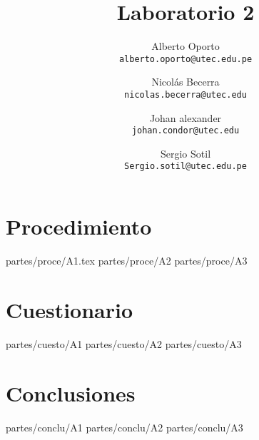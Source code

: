 \documentclass[12pt]{article}
\title{\textbf{Laboratorio 2}}
\author{
		Alberto Oporto\\
		\texttt{alberto.oporto@utec.edu.pe}\\
		\and Nicolás Becerra\\
		\texttt{nicolas.becerra@utec.edu}\\
		\and Johan alexander\\
		\texttt{johan.condor@utec.edu}\\
		\and Sergio Sotil\\
		\texttt{Sergio.sotil@utec.edu.pe}\\
		}
\begin{document}
\maketitle
\thispagestyle{fancy}

\section{Procedimiento}%
\label{sec:procedimiento}

{partes/proce/A1.tex}
{partes/proce/A2}
{partes/proce/A3}

\section{Cuestionario}%
\label{sec:cuestionario}

{partes/cuesto/A1}
{partes/cuesto/A2}
{partes/cuesto/A3}

\section{Conclusiones}%
\label{sec:conclusiones}

{partes/conclu/A1}
{partes/conclu/A2}
{partes/conclu/A3}
\end{document}
